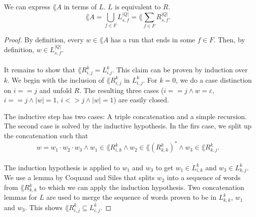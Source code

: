 \begin{theorem} We can express $\lang{A}$ in terms of $L$. $L$ is equivalent to $R$.
    \label{LR}
    \begin{equation*}                          
        \lang{A} = \bigcup\limits_{f \in F} L^{|Q|}_{s, f} = \lang{\sum\limits_{f \in F} R^{|Q|}_{s, f}}.                            
    \end{equation*}
\end{theorem}

\begin{proof}
    By definition, every $w \in \lang{A}$ has a run that ends in some $f \in F$. 
    Then, by definition, $w \in  L^{|Q|}_{s, f}$. 

    \paragraph{}
    It remains to show that $\lang{R^k_{i,j}} = L^k_{i.j}$. 
    This claim can be proven by induction over $k$. 
    We begin with the inclusion of $\lang{R^k_{i,j}}$ in $L^k_{i,j}$. 
    For $k=0$, we do a case distinction on $i==j$ and unfold $R$. 
    The resulting three cases ($i==j \wedge w=\varepsilon$, $i==j \wedge |w|=1$, $i<>j \wedge |w|=1$) are easily closed. 

    The inductive step has two cases: A triple concatenation and a simple recursion. 
    The second case is solved by the inductive hypothesis.
    In the firs case, we split up the concatenation such that
    \begin{equation*}
        w = w_1 \cdot w_2 \cdot w_3 
        \wedge w_1 \in \lang{R^k_{i,k}} 
        \wedge w_2 \in \lang{(R^k_{k,k})^*} 
        \wedge w_3 \in \lang{R^k_{k,j}}.                               
    \end{equation*}
    \paragraph{}
    The induction hypothesis is applied to $w_1$ and $w_3$ to get $w_1 \in L^k_{i,k}$ and $w_3 \in L^k_{k,j}$.
    We use a lemma by Coquand and Siles that splits $w_2$ into a sequence of words from $\lang{R^k_{k,k}}$ to which we can apply the induction hypothesis. 
    Two concatenation lemmas for $L$ are used to merge the sequence of words proven to be in $L^k_{k,k}$,
    $w_1$ and $w_3$. This shows $\lang{R^k_{i,j}} \subseteq L^k_{i,j}$.


\end{proof}
